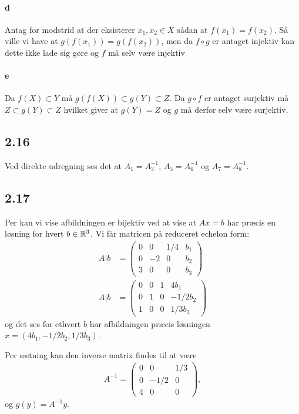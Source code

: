 			\paragraph{d} Antag for modstrid at der eksisterer $x_1,x_2 \in X$ sådan at $f(x_1)=f(x_2)$. Så ville vi have at $g(f(x_1))=g(f(x_2))$, men da $f \circ g$ er antaget injektiv kan dette ikke lade sig gøre og $f$ må selv være injektiv

			\paragraph{e} Da $f(X)\subset Y$ må $g(f(X)) \subset g(Y) \subset Z$. Da $g \circ f$ er antaget surjektiv må $Z \subset g(Y) \subset Z$ hvilket giver at $g(Y)=Z$ og $g$ må derfor selv være surjektiv.

		\subsection{2.16}

			Ved direkte udregning ses det at $A_1=A_3^{-1}$, $A_5=A_6^{-1}$ og $A_7=A_8^{-1}$. 

		\subsection{2.17} 

			Per \cite[sætning 2.4.9]{hesselholt2017} kan vi vise afbildningen er bijektiv ved at vise at $Ax=b$ har præcis en løsning for hvert $b\in \mathbb{R}^3$.  Vi får matricen på reduceret echelon form:
				\begin{align*}
					A|b&=\left(\begin{array}{ccc|c}{0} & {0} & {1 / 4} & {b_1} \\ {0} & {-2} & {0} & {b_2} \\ {3} & {0} & {0} & {b_3} \end{array}\right) \\
					A|b&=\left(\begin{array}{ccc|c}{0} & {0} & {1} & {4b_1} \\ {0} & {1} & {0} & {-1/2b_2} \\ {1} & {0} & {0} & {1/3b_3} \end{array}\right) 
				\end{align*} 
			og det ses for ethvert $b$ har afbildningen præcis løsningen $x=(4b_1,-1/2b_2,1/3b_3)$.

			Per sætning \cite[2.4.12]{hesselholt2017} kan den inverse matrix findes til at være 
				\begin{align*}
					A^{-1}=\left(\begin{array}{ccc}{0} & {0} & {1/3} \\ {0} & {-1/2} & {0} \\ {4} & {0} & {0} \end{array}\right),
				\end{align*} 
			og $g(y)=A^{-1}y$.

